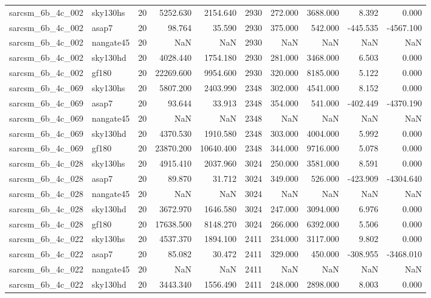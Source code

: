 \begin{longtable}{llrrrrrrrr}
sarcsm\_6b\_4c\_002 & sky130hs & 20 & 5252.630 & 2154.640 & 2930 & 272.000 & 3688.000 & 8.392 & 0.000 \\
sarcsm\_6b\_4c\_002 & asap7 & 20 & 98.764 & 35.590 & 2930 & 375.000 & 542.000 & -445.535 & -4567.100 \\
sarcsm\_6b\_4c\_002 & nangate45 & 20 & NaN & NaN & 2930 & NaN & NaN & NaN & NaN \\
sarcsm\_6b\_4c\_002 & sky130hd & 20 & 4028.440 & 1754.180 & 2930 & 281.000 & 3468.000 & 6.503 & 0.000 \\
sarcsm\_6b\_4c\_002 & gf180 & 20 & 22269.600 & 9954.600 & 2930 & 320.000 & 8185.000 & 5.122 & 0.000 \\
sarcsm\_6b\_4c\_069 & sky130hs & 20 & 5807.200 & 2403.990 & 2348 & 302.000 & 4541.000 & 8.152 & 0.000 \\
sarcsm\_6b\_4c\_069 & asap7 & 20 & 93.644 & 33.913 & 2348 & 354.000 & 541.000 & -402.449 & -4370.190 \\
sarcsm\_6b\_4c\_069 & nangate45 & 20 & NaN & NaN & 2348 & NaN & NaN & NaN & NaN \\
sarcsm\_6b\_4c\_069 & sky130hd & 20 & 4370.530 & 1910.580 & 2348 & 303.000 & 4004.000 & 5.992 & 0.000 \\
sarcsm\_6b\_4c\_069 & gf180 & 20 & 23870.200 & 10640.400 & 2348 & 344.000 & 9716.000 & 5.078 & 0.000 \\
sarcsm\_6b\_4c\_028 & sky130hs & 20 & 4915.410 & 2037.960 & 3024 & 250.000 & 3581.000 & 8.591 & 0.000 \\
sarcsm\_6b\_4c\_028 & asap7 & 20 & 89.870 & 31.712 & 3024 & 349.000 & 526.000 & -423.909 & -4304.640 \\
sarcsm\_6b\_4c\_028 & nangate45 & 20 & NaN & NaN & 3024 & NaN & NaN & NaN & NaN \\
sarcsm\_6b\_4c\_028 & sky130hd & 20 & 3672.970 & 1646.580 & 3024 & 247.000 & 3094.000 & 6.976 & 0.000 \\
sarcsm\_6b\_4c\_028 & gf180 & 20 & 17638.500 & 8148.270 & 3024 & 266.000 & 6392.000 & 5.506 & 0.000 \\
sarcsm\_6b\_4c\_022 & sky130hs & 20 & 4537.370 & 1894.100 & 2411 & 234.000 & 3117.000 & 9.802 & 0.000 \\
sarcsm\_6b\_4c\_022 & asap7 & 20 & 85.082 & 30.472 & 2411 & 329.000 & 450.000 & -308.955 & -3468.010 \\
sarcsm\_6b\_4c\_022 & nangate45 & 20 & NaN & NaN & 2411 & NaN & NaN & NaN & NaN \\
sarcsm\_6b\_4c\_022 & sky130hd & 20 & 3443.340 & 1556.490 & 2411 & 248.000 & 2898.000 & 8.003 & 0.000 \\

\end{longtable}
